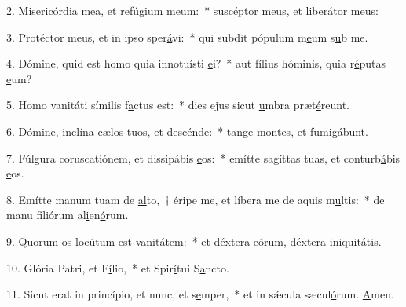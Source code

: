 2. Misericórdia mea, et refúgium m\uline{e}um:~* suscéptor meus, et liber\uline{á}tor m\uline{e}us:\par 
3. Protéctor meus, et in ipso sper\uline{á}vi:~* qui subdit pópulum m\uline{e}um s\uline{u}b me.\par 
4. Dómine, quid est homo quia innotuísti \uline{e}i?~* aut fílius hóminis, quia r\uline{é}putas \uline{e}um?\par 
5. Homo vanitáti símilis f\uline{a}ctus est:~* dies ejus sicut \uline{u}mbra præt\uline{é}reunt.\par 
6. Dómine, inclína cælos tuos, et desc\uline{é}nde:~* tange montes, et f\uline{u}mig\uline{á}bunt.\par 
7. Fúlgura coruscatiónem, et dissipábis \uline{e}os:~* emítte sagíttas tuas, et conturb\uline{á}bis \uline{e}os.\par 
8. Emítte manum tuam de \uline{al}to,~† éripe me, et líbera me de aquis m\uline{u}ltis:~* de manu filiórum al\uline{i}en\uline{ó}rum.\par 
9. Quorum os locútum est vanit\uline{á}tem:~* et déxtera eórum, déxtera in\uline{i}quit\uline{á}tis.\par 
10. Glória Patri, et F\uline{í}lio,~* et Spir\uline{í}tui S\uline{a}ncto.\par 
11. Sicut erat in princípio, et nunc, et s\uline{e}mper,~* et in sǽcula sæcul\uline{ó}rum. \uline{A}men.\par 
